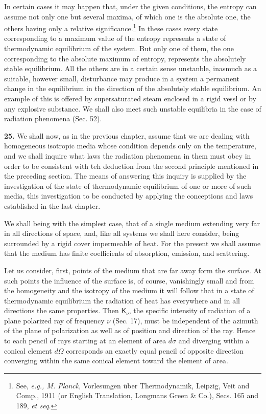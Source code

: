 \documentclass[12pt,oneside]{book}
\begin{document}
In certain cases it may happen that, under the given conditions, the entropy can assume not only one but several maxima, of which one is the absolute one, the others having only a relative significance.\footnote{See, \textit{e.g., M. Planck}, Vorlesungen \"uber Thermodynamik, Leipzig, Veit and Comp., 1911 (or English Translation, Longmans Green \& Co.), Secs. 165 and 189, \textit{et seq.}} In these cases every state corresponding to a maximum value of the entropy represents a state of thermodynamic equilibrium of the system. But only one of them, the one corresponding to the absolute maximum of entropy, represents the absolutely stable equilibrium. All the others are in a certain sense unstanble, inasmuch as a suitable, however small, disturbance may produce in a system a permanent change in the equilibrium in the direction of the absolutely stable equilibrium. An example of this is offered by supersaturated steam enclosed in a rigid vessl or by any explosive substance. We shall also meet such unstable equilibria in the case of radiation phenomena (Sec. 52). \par

\textbf{25.} We shall now, as in the previous chapter, assume that we are dealing with homogeneous isotropic media whose condition depends only on the temperature, and we shall inquire what laws the radiation phenomena in them must obey in order to be consistent with teh deduction from the second principle mentioned in the preceding section. The means of answering this inquiry is supplied by the investigation of the state of thermodynamic equilibrium of one or more of such media, this investigation to be conducted by applying the conceptions and laws established in the last chapter. \par

We shall being with the simplest case, that of a single medium extending very far in all directions of space, and, like all systems we shall here consider, being surrounded by a rigid cover impermeable of heat. For the present we shall assume that the medium has finite coefficients of absorption, emission, and scattering. \par

Let us consider, first, points of the medium that are far away form the surface. At such points the influence of the surface is, of course, vanishingly small and from the homogeneity and the isotropy of the medium it will follow that in a state of thermodynamic equilibrium the radiation of heat has everywhere and in all directions the same properties. Then $\mathsf{K}_\nu$, the specific intensity of radiation of a plane polarized ray of frequency $\nu$ (Sec. 17), must be independent of the azimuth of the plane of polarization as well as of position and direction of the ray. Hence to each pencil of rays starting at an element of area $d\sigma$ and diverging within a conical element $d\Omega$ corresponds an exactly equal pencil of opposite direction converging within the same conical element toward the element of area. \par
\end{document}
